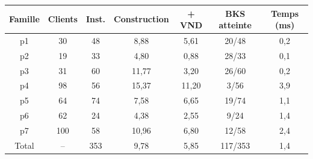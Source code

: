 \begin{tabular}{|c|c|c|c|c|c|c|}
\hline
\textbf{Famille} & \textbf{Clients} & \textbf{Inst.} & \textbf{Construction} & \textbf{+ VND} & \textbf{BKS atteinte} & \textbf{Temps (ms)} \\
\hline
p1 & 30 & 48 & 8{,}88 & 5{,}61 & 20/48 & 0{,}2 \\
\hline
p2 & 19 & 33 & 4{,}80 & 0{,}88 & 28/33 & 0{,}1 \\
\hline
p3 & 31 & 60 & 11{,}77 & 3{,}20 & 26/60 & 0{,}2 \\
\hline
p4 & 98 & 56 & 15{,}37 & 11{,}20 & 3/56 & 3{,}9 \\
\hline
p5 & 64 & 74 & 7{,}58 & 6{,}65 & 19/74 & 1{,}1 \\
\hline
p6 & 62 & 24 & 4{,}38 & 2{,}55 & 9/24 & 1{,}4 \\
\hline
p7 & 100 & 58 & 10{,}96 & 6{,}80 & 12/58 & 2{,}4 \\
\hline
\hline
Total & -- & 353 & 9{,}78 & 5{,}85 & 117/353 & 1{,}4 \\
\hline
\end{tabular}
